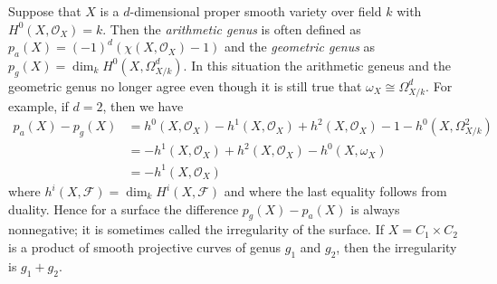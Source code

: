 \begin{remark}
\label{remark-genus-higher-dimension}
Suppose that $X$ is a $d$-dimensional
proper smooth variety over field $k$ with $H^0(X, \mathcal{O}_X) = k$.
Then the {\it arithmetic genus} is often defined as
$p_a(X) = (-1)^d(\chi(X, \mathcal{O}_X) - 1)$ and the {\it geometric genus}
as $p_g(X) = \dim_k H^0(X, \Omega^d_{X/k})$. In this situation
the arithmetic geneus and the geometric genus no longer agree
even though it is still true that $\omega_X \cong \Omega_{X/k}^d$.
For example, if $d = 2$, then we have
\begin{align*}
p_a(X) - p_g(X) & =
h^0(X, \mathcal{O}_X) - h^1(X, \mathcal{O}_X) + h^2(X, \mathcal{O}_X) - 1
- h^0(X, \Omega^2_{X/k}) \\
& =
- h^1(X, \mathcal{O}_X) + h^2(X, \mathcal{O}_X) - h^0(X, \omega_X) \\
& =
- h^1(X, \mathcal{O}_X)
\end{align*}
where $h^i(X, \mathcal{F}) = \dim_k H^i(X, \mathcal{F})$ and
where the last equality follows from duality.
Hence for a surface the difference $p_g(X) - p_a(X)$ is always
nonnegative; it is sometimes called the irregularity of the surface.
If $X = C_1 \times C_2$ is a product of smooth projective curves of
genus $g_1$ and $g_2$, then the irregularity is $g_1 + g_2$.
\end{remark}



















